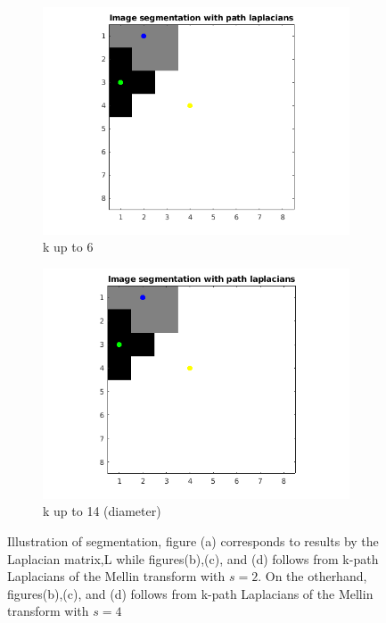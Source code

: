 \documentclass[10pt,a4paper]{article}
\begin{document}
\begin{figure}[!h]
\begin{subfigure}[b]{0.45\textwidth}
		\includegraphics[width=\textwidth]{segmentation-images/8by8longrange6-s4.png}
		\caption{k up to 6}
	\end{subfigure}
	\begin{subfigure}[b]{0.45\textwidth}
		\includegraphics[width=\textwidth]{segmentation-images/8by8longrange14-s4.png}
		\caption{k up to 14 (diameter)}
	\end{subfigure}
	
	\caption{ Illustration of segmentation, figure (a) corresponds to results by the Laplacian matrix,L while figures(b),(c), and (d) follows from k-path Laplacians of the Mellin transform with $s=2$. On the otherhand, figures(b),(c), and (d) follows from k-path Laplacians of the Mellin transform with $s=4$} 
\end{figure}
\end{document}

